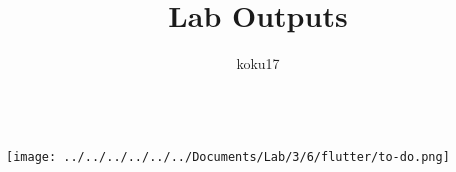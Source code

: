 \documentclass{article}
\title{Lab Outputs}
\author{koku17}
\begin{document}
	 \hspace{-7em}
	 \\
	
	\texttt{[image: ../../../../../../Documents/Lab/3/6/flutter/to-do.png]}
	\newpage
	\inputminted{text}{Lab3.out}
\end{document}
